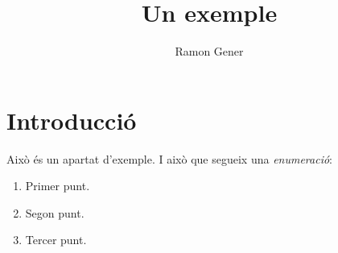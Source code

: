 \documentclass[english]{tfgitic}
\title{Un exemple}
\author{Ramon Gener}
\begin{document}
\maketitle{}

\section{Introducció}
Això és un apartat d'exemple. I això que segueix una \emph{enumeració}:
\begin{enumerate}
\item Primer punt.
\item Segon punt.
\item Tercer punt.
\end{enumerate}
\end{document}
